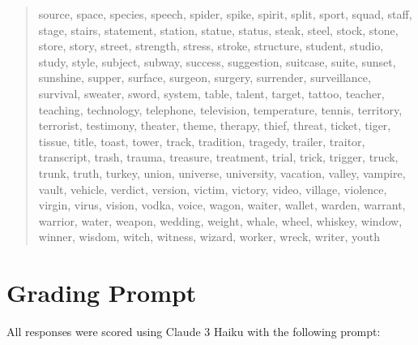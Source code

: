\documentclass{article}
\begin{document}
\begin{quote}
source, space, species, speech, spider, spike, spirit, split, sport, squad, staff, stage, stairs, statement, station, statue, status, steak, steel, stock, stone, store, story, street, strength, stress, stroke, structure, student, studio, study, style, subject, subway, success, suggestion, suitcase, suite, sunset, sunshine, supper, surface, surgeon, surgery, surrender, surveillance, survival, sweater, sword, system, table, talent, target, tattoo, teacher, teaching, technology, telephone, television, temperature, tennis, territory, terrorist, testimony, theater, theme, therapy, thief, threat, ticket, tiger, tissue, title, toast, tower, track, tradition, tragedy, trailer, traitor, transcript, trash, trauma, treasure, treatment, trial, trick, trigger, truck, trunk, truth, turkey, union, universe, university, vacation, valley, vampire, vault, vehicle, verdict, version, victim, victory, video, village, violence, virgin, virus, vision, vodka, voice, wagon, waiter, wallet, warden, warrant, warrior, water, weapon, wedding, weight, whale, wheel, whiskey, window, winner, wisdom, witch, witness, wizard, worker, wreck, writer, youth
\end{quote}

\section{Grading Prompt}
\label{app:grading}

All responses were scored using Claude 3 Haiku with the following prompt:
\end{document}
